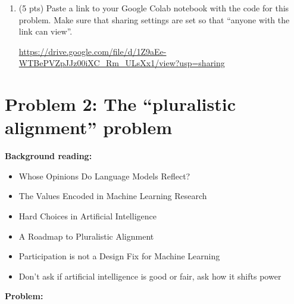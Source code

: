 \documentclass{article}
\begin{document}
\begin{enumerate}[label=(\alph*)]
    \item (5 pts) Paste a link to your Google Colab notebook with the code for this problem. Make sure that sharing settings are set so that ``anyone with the link can view''.    

    \bigskip

    \begin{mdframed}
        \url{https://drive.google.com/file/d/1Z9aEe-WTBePVZpJJz00iXC_Rm_ULsXx1/view?usp=sharing}
    \end{mdframed}
    
\end{enumerate}




    





\newpage

\section*{Problem 2: The ``pluralistic alignment'' problem}

\textbf{Background reading:}
\begin{itemize}
    \item Whose Opinions Do Language Models Reflect? \citep{santurkar2023whose}
    \item The Values Encoded in Machine Learning Research \citep{birhane2022values}
    \item Hard Choices in Artificial Intelligence \citep{dobbe2021hard}
    \item A Roadmap to Pluralistic Alignment \citep{sorensen2024roadmap}
    \item Participation is not a Design Fix for Machine Learning \citep{sloane2022participation}
    \item Don’t ask if artificial intelligence is good or fair, ask how it shifts power \citep{kalluri2020don}
\end{itemize}

\textbf{Problem:}
\end{document}
